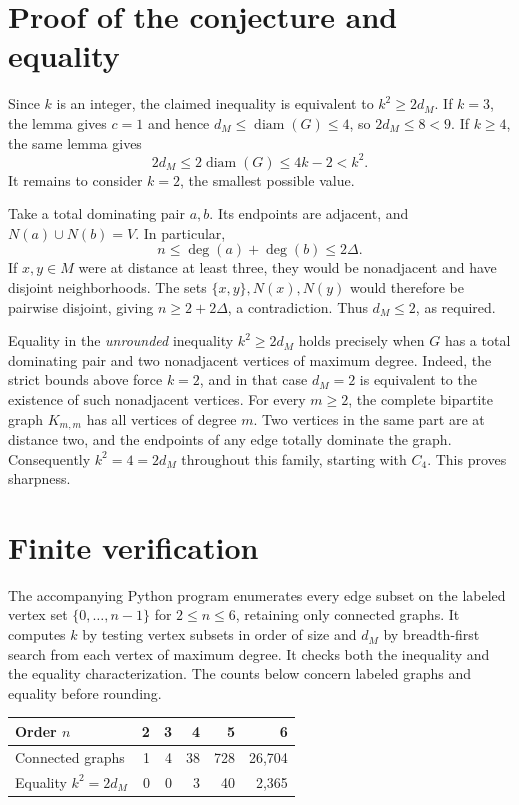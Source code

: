 \documentclass[10pt]{article}
\newcommand{\dM}{d_M}
\newcommand{\diam}{\operatorname{diam}}
\begin{document}
\newpage
\section{Proof of the conjecture and equality}
Since \(k\) is an integer, the claimed inequality is equivalent to
\(k^2\ge 2\dM\). If \(k=3\), the lemma gives \(c=1\) and hence
\(\dM\le\diam(G)\le4\), so \(2\dM\le8<9\). If \(k\ge4\), the same lemma
gives
\[
  2\dM\le 2\diam(G)\le 4k-2 < k^2.
\]
It remains to consider \(k=2\), the smallest possible value.

Take a total dominating pair \(a,b\). Its endpoints are adjacent, and
\(N(a)\cup N(b)=V\). In particular,
\[
  n\le \deg(a)+\deg(b)\le 2\Delta.
\]
If \(x,y\in M\) were at distance at least three, they would be nonadjacent
and have disjoint neighborhoods. The sets \(\{x,y\},N(x),N(y)\) would
therefore be pairwise disjoint, giving \(n\ge 2+2\Delta\), a contradiction.
Thus \(\dM\le2\), as required.

Equality in the \emph{unrounded} inequality \(k^2\ge 2\dM\) holds precisely
when \(G\) has a total dominating pair and two nonadjacent vertices of
maximum degree. Indeed, the strict bounds above force \(k=2\), and in
that case \(\dM=2\) is equivalent to the existence of such nonadjacent
vertices. For every \(m\ge2\), the complete bipartite graph \(K_{m,m}\)
has all vertices of degree \(m\). Two vertices in the same part are at
distance two, and the endpoints of any edge totally dominate the graph.
Consequently \(k^2=4=2\dM\) throughout this family, starting with \(C_4\).
This proves sharpness.

\section{Finite verification}
The accompanying Python program enumerates every edge subset on the
labeled vertex set \(\{0,\ldots,n-1\}\) for \(2\le n\le6\), retaining only
connected graphs. It computes \(k\) by testing vertex subsets in order of
size and \(\dM\) by breadth-first search from each vertex of maximum degree.
It checks both the inequality and the equality characterization.
The counts below concern labeled graphs and equality before rounding.
\begin{center}
\begin{tabular}{lrrrrr}
\hline
Order \(n\) & 2 & 3 & 4 & 5 & 6\\
\hline
Connected graphs & 1 & 4 & 38 & 728 & 26,704\\
Equality \(k^2=2\dM\) & 0 & 0 & 3 & 40 & 2,365\\
\hline
\end{tabular}
\end{center}
\end{document}

